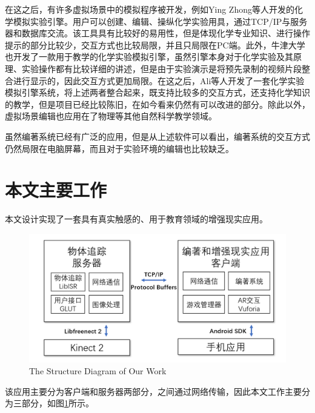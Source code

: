 在这之后，有许多虚拟场景中的模拟程序被开发，例如Ying Zhong等人开发的化学模拟实验引擎。\cite{zhong2014domain}用户可以创建、编辑、操纵化学实验用具，通过TCP/IP与服务器和数据库交流。该工具具有比较好的易用性，但是体现化学专业知识、进行操作提示的部分比较少，交互方式也比较局限，并且只局限在PC端。此外，牛津大学也开发了一款用于教学的化学实验模拟引擎，虽然引擎本身对于化学实验及其原理、实验操作都有比较详细的讲述，但是由于实验演示是将预先录制的视频片段整合进行显示的，因此交互方式更加局限。\cite{OxfordChe}在这之后，Ali等人开发了一套化学实验模拟引擎系统，\cite{ali2014effect}将上述两者整合起来，既支持比较多的交互方式，还支持化学知识的教学，但是项目已经比较陈旧，在如今看来仍然有可以改进的部分。除此以外，虚拟场景编辑也应用在了物理等其他自然科学教学领域。\cite{daineko2017using}

虽然编著系统已经有广泛的应用，但是从上述软件可以看出，编著系统的交互方式仍然局限在电脑屏幕，而且对于实验环境的编辑也比较缺乏。

\section{本文主要工作}
本文设计实现了一套具有真实触感的、用于教育领域的增强现实应用。

\begin{figure}[!htp]
  \centering
  \includegraphics[width=12cm]{figure/work.png}
    {The Structure Diagram of Our Work}
 \label{fig:work}
\end{figure}

该应用主要分为客户端和服务器两部分，之间通过网络传输，因此本文工作主要分为三部分，如图\ref{fig:work}所示。

